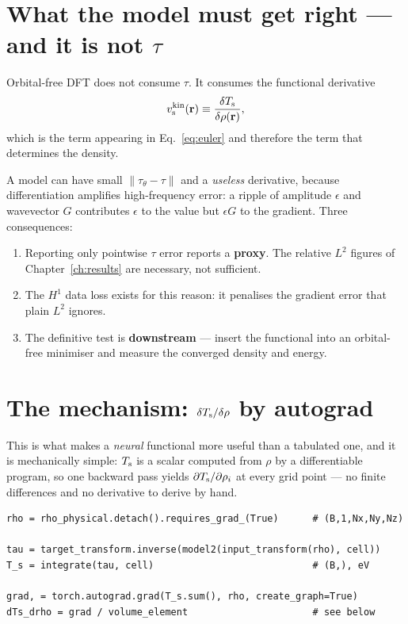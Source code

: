 \section{What the model must get right --- and it is not \texorpdfstring{$\tau$}{tau}}
\label{sec:notthetau}

Orbital-free DFT does not consume $\tau$. It consumes the functional
derivative
\begin{equation}
  v^{\mathrm{kin}}_{\mathrm{s}}(\mathbf{r}) \equiv \frac{\delta T_{\mathrm{s}}}{\delta\rho(\mathbf{r})},
\end{equation}
which is the term appearing in Eq.~\eqref{eq:euler} and therefore the term that
determines the density.

A model can have small $\lVert\tau_\theta-\tau\rVert$ and a \emph{useless}
derivative, because differentiation amplifies high-frequency error: a ripple of
amplitude $\epsilon$ and wavevector $G$ contributes $\epsilon$ to the value but
$\epsilon G$ to the gradient. Three consequences:

\begin{enumerate}
  \item Reporting only pointwise $\tau$ error reports a \textbf{proxy}. The
    relative $L^2$ figures of Chapter~\ref{ch:results} are necessary, not
    sufficient.
  \item The $H^1$ data loss exists for this reason: it penalises the gradient
    error that plain $L^2$ ignores.
  \item The definitive test is \textbf{downstream} --- insert the functional
    into an orbital-free minimiser and measure the converged density and energy.
\end{enumerate}

\section{The mechanism: \texorpdfstring{$\delta T_{\mathrm{s}}/\delta\rho$}{dTs/drho} by autograd}
\label{sec:autograd}

This is what makes a \emph{neural} functional more useful than a tabulated one,
and it is mechanically simple: $T_{\mathrm{s}}$ is a scalar computed from $\rho$ by a
differentiable program, so one backward pass yields
$\partial T_{\mathrm{s}}/\partial\rho_i$ at every grid point --- no finite differences and
no derivative to derive by hand.

\begin{lstlisting}
rho = rho_physical.detach().requires_grad_(True)      # (B,1,Nx,Ny,Nz)

tau = target_transform.inverse(model2(input_transform(rho), cell))
T_s = integrate(tau, cell)                            # (B,), eV

grad, = torch.autograd.grad(T_s.sum(), rho, create_graph=True)
dTs_drho = grad / volume_element                      # see below
\end{lstlisting}

